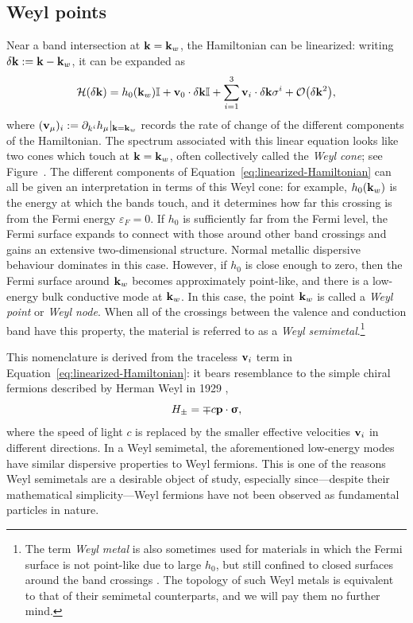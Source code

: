 \subsection{Weyl points}
Near a band intersection at $\vb{k}=\vb{k}_w$, the Hamiltonian can be linearized: writing $\delta\vb{k} := \vb{k} - \vb{k}_w$, it can be expanded as
\begin{equation}\label{eq:linearized-Hamiltonian}
	\Hc(\delta\k) = h_0(\k_w)\Id + \vb{v}_0\cdot\delta\k\Id + \sum_{i=1}^{3}\vb{v}_i\cdot\delta\k \sigma^i + \order{\delta\k^2},
\end{equation} %
where $(\vb{v}_\mu)_i := \partial_{k^i}h_\mu |_{\vb{k}=\vb{k}_w}$ records the rate of change of the different components of the Hamiltonian. The spectrum associated with this linear equation looks like two cones which touch at $\vb{k}=\vb{k}_w$, often collectively called the \emph{Weyl cone}; see Figure~. %
The different components of Equation~\eqref{eq:linearized-Hamiltonian} can all be given an interpretation in terms of this Weyl cone: for example, $h_0(\vb{k}_w)$ is the energy at which the bands touch, and it determines how far this crossing is from the Fermi energy $\varepsilon_F=0$. If $h_0$ is sufficiently far from the Fermi level, the Fermi surface expands to connect with those around other band crossings and gains an extensive two-dimensional structure. Normal metallic dispersive behaviour dominates in this case. However, if $h_0$ is close enough to zero, then the Fermi surface around $\vb{k}_w$ becomes approximately point-like, and there is a low-energy bulk conductive mode at $\vb{k}_w$. In this case, the point $\vb{k}_w$ is called a \emph{Weyl point} or \emph{Weyl node}. When all of the crossings between the valence and conduction band have this property, the material is referred to as a \emph{Weyl semimetal}.\footnote{
	The term \emph{Weyl metal} is also sometimes used for materials in which the Fermi surface is not point-like due to large $h_0$, but still confined to closed surfaces around the band crossings \cite{Burkov_Weyl-metals}. The topology of such Weyl metals is equivalent to that of their semimetal counterparts, and we will pay them no further mind.}

This nomenclature is derived from the traceless $\vb{v}_i$ term in Equation~\eqref{eq:linearized-Hamiltonian}: it bears resemblance to the simple chiral fermions described by Herman Weyl in 1929 \cite{Weyl_fermions},
\begin{equation*}
	H_\pm = \mp c\vb{p}\cdot\bm{\upsigma},
\end{equation*}
where the speed of light $c$ is replaced by the smaller effective velocities $\vb{v}_i$ in different directions. In a Weyl semimetal, the aforementioned low-energy modes have similar dispersive properties to Weyl fermions. This is one of the reasons Weyl semimetals are a desirable object of study, especially since---despite their mathematical simplicity---Weyl fermions have not been observed as fundamental particles in nature.

